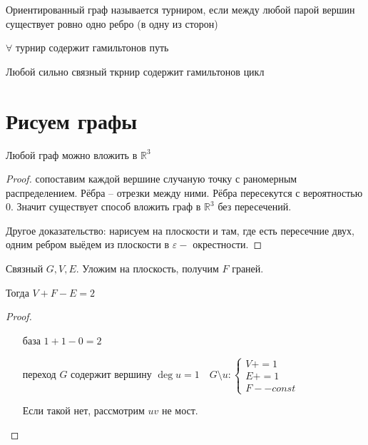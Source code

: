 \documentclass{book}
\newcommand\R{\ensuremath{\mathbb{R}}}
\theoremstyle{definition}
\begin{document}
\begin{definition}
    Ориентированный граф называется турниром, если между любой парой вершин существует ровно одно ребро (в одну из сторон)
\end{definition}
\begin{theorem}

    $\forall $ турнир содержит гамильтонов путь

    Любой сильно связный ткрнир содержит гамильтонов цикл
\end{theorem}

\section{Рисуем графы}

\begin{statement}
    Любой граф можно вложить в $\R^3$
\end{statement}
\begin{proof}
    сопоставим каждой вершине случаную точку с раномерным распределением. Рёбра -- отрезки между ними. Рёбра пересекутся с вероятностью 0. Значит существует способ вложить граф в $\R^3$ без пересечений.

    Другое доказательство: нарисуем на плоскости и там, где есть пересечние двух, одним ребром выёдем из плоскости в $\varepsilon-$ окрестности.
\end{proof}

\begin{theorem}
     Связный $G, V, E$. Уложим на плоскость, получим $F$ граней.

    Тогда  $V+F-E=2$
\end{theorem}
\begin{proof}
    \begin{itemize}
        \item []
        \item [база] $1+1-0 = 2$
        \item [переход] $G$ содержит вершину  $\deg u = 1\quad G \setminus u: \begin{cases}
            V+=1\\
            E+=1\\
            F--const
        \end{cases}$ 

        Если такой нет, рассмотрим $uv$ не мост.
    \end{itemize}
\end{proof}
\end{document}
